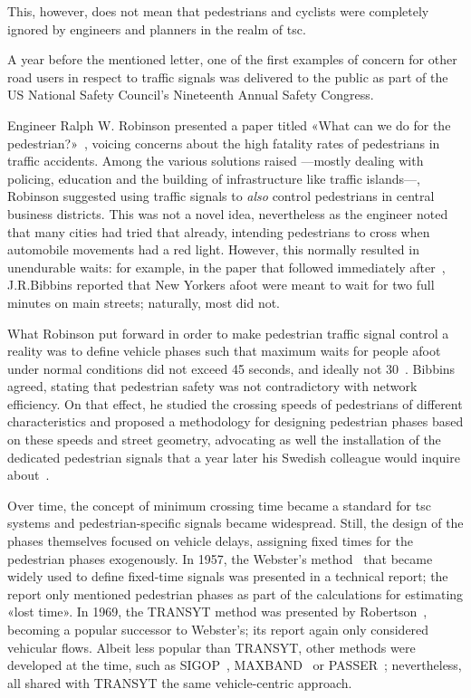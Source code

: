 This, however, does not mean that pedestrians and cyclists were completely ignored by engineers and planners in the realm of \acrlong{tsc}. 

\medskip

\noindent A year before the mentioned letter, one of the first examples of concern for other road users in respect to traffic signals was delivered to the public as part of the US National Safety Council's Nineteenth Annual Safety Congress.

Engineer Ralph W. Robinson presented a paper titled «What can we do for the pedestrian?»~\cite{Robinson1930}, voicing concerns about the high fatality rates of pedestrians in traffic accidents. Among the various solutions raised —mostly dealing with policing, education and the building of infrastructure like traffic islands—, Robinson suggested using traffic signals to \textit{also} control pedestrians in central business districts. This was not a novel idea, nevertheless as the engineer noted that many cities had tried that already, intending pedestrians to cross when automobile movements had a red light. However, this normally resulted in unendurable waits: for example, in the paper that followed immediately after~\cite{Bibbins1930}, J.\/R.\/Bibbins reported that New Yorkers afoot were meant to wait for two full minutes on main streets; naturally, most did not.

What Robinson put forward in order to make pedestrian traffic signal control a reality was to define vehicle phases such that maximum waits for people afoot under normal conditions did not exceed 45 seconds, and ideally not 30~\cite{Robinson1930}. Bibbins agreed, stating that pedestrian safety was not contradictory with network efficiency. On that effect, he studied the crossing speeds of pedestrians of different characteristics and proposed a methodology for designing pedestrian phases based on these speeds and street geometry, advocating as well the installation of the dedicated pedestrian signals that a  year later his Swedish colleague would inquire about~\cite{Bibbins1930}.

\medskip

\noindent Over time, the concept of minimum crossing time became a standard for \gls{tsc} systems and pedestrian-specific signals became widespread. Still, the design of the phases themselves focused on vehicle delays, assigning fixed times for the pedestrian phases exogenously. In 1957, the Webster's method~\cite{Webster1957} that became widely used to define fixed-time signals was presented in a technical report; the report only mentioned pedestrian phases as part of the calculations for estimating «lost time». In 1969, the TRANSYT method was presented by Robertson~\cite{Robertson1969}, becoming a popular successor to Webster's; its report again only considered vehicular flows. Albeit less popular than TRANSYT, other methods were developed at the time, such as SIGOP~\cite{Lieberman1976}, MAXBAND~\cite{Chang1988} or PASSER~\cite{Chaudhary2003}; nevertheless, all shared with TRANSYT the same vehicle-centric approach.

